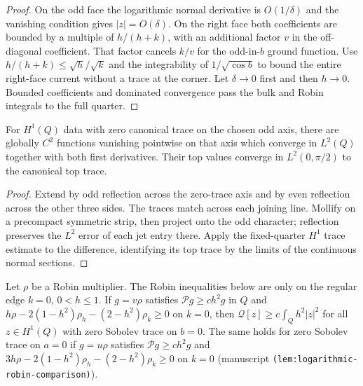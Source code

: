 \begin{proof}
\leanok
On the odd face the logarithmic normal derivative is $O(1/\delta)$
and the vanishing condition gives $|z|=O(\delta)$. On the right face
both coefficients are bounded by a multiple of $h/(h+k)$, with an
additional factor $v$ in the off-diagonal coefficient. That factor
cancels $k/v$ for the odd-in-$b$ ground function. Use
$h/(h+k)\le\sqrt h/\sqrt k$ and the integrability of $1/\sqrt{\cos b}$
to bound the entire right-face current without a trace at the corner.
Let $\delta\to0$ first and then $h\to0$. Bounded coefficients and dominated
convergence pass the bulk and Robin integrals to the full quarter.
\end{proof}

\begin{lemma}
\label{lem:mixed-quarter-smooth-approximation}
\leanok
For $H^1(Q)$ data with zero canonical trace on the chosen odd axis,
there are globally $C^2$ functions vanishing pointwise on that axis
which converge in $L^2(Q)$ together with both first derivatives.
Their top values converge in $L^2(0,\pi/2)$ to the canonical top trace.
\end{lemma}

\begin{proof}
\leanok
Extend by odd reflection across the zero-trace axis and by even reflection
across the other three sides. The traces match across each joining line.
Mollify on a precompact symmetric strip, then project onto the odd character;
reflection preserves the $L^2$ error of each jet entry there. Apply the
fixed-quarter $H^1$ trace estimate to the difference, identifying its top
trace by the limits of the continuous normal sections.
\end{proof}

\begin{lemma}
\label{lem:robin-comparison}
\leanok
Let $\rho$ be a Robin multiplier. The Robin inequalities below are only
on the regular edge $k=0$, $0<h\le1$. If $g=v\rho$
satisfies $\mathcal Pg\ge ch^2g$ in $Q$ and
$h\rho-2(1-h^2)\rho_h-(2-h^2)\rho_k\ge0$ on $k=0$, then
$\mathcal Q[z]\ge c\int_Qh^2|z|^2$ for all $z\in H^1(Q)$ with zero Sobolev
trace on $b=0$. The same holds for zero Sobolev trace on $a=0$ if $g=u\rho$
satisfies $\mathcal Pg\ge ch^2g$ and
$3h\rho-2(1-h^2)\rho_h-(2-h^2)\rho_k\ge0$ on $k=0$
(manuscript \texttt{(lem:logarithmic-robin-comparison)}).
\end{lemma}

